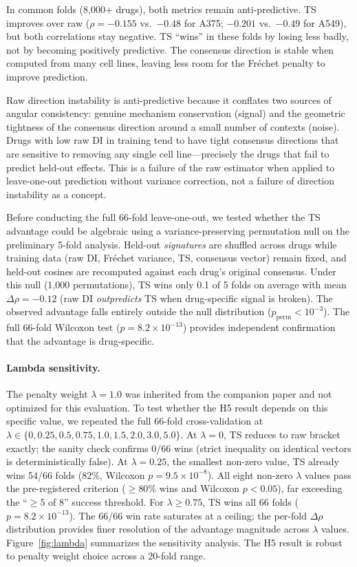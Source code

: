 \documentclass[11pt]{article}
\begin{document}
In common folds (8{,}000+ drugs), both metrics remain
anti-predictive. TS improves over raw ($\rho = -0.155$ vs.\ $-0.48$ for
A375; $-0.201$ vs.\ $-0.49$ for A549), but both correlations stay
negative. TS ``wins'' in these folds by losing less badly, not by becoming
positively predictive. The consensus direction is stable when computed from
many cell lines, leaving less room for the Fr\'{e}chet penalty to
improve prediction.

Raw direction instability is anti-predictive because it conflates two
sources of angular consistency: genuine mechanism conservation (signal)
and the geometric tightness of the consensus direction around a small
number of contexts (noise). Drugs with low raw DI in training tend to
have tight consensus directions that are sensitive to removing any single
cell line---precisely the drugs that fail to predict held-out effects.
This is a failure of the raw estimator when applied to leave-one-out
prediction without variance correction, not a failure of direction
instability as a concept.

Before conducting the full 66-fold leave-one-out, we tested whether the
TS advantage could be algebraic using a variance-preserving permutation
null on the preliminary 5-fold analysis. Held-out
\emph{signatures} are shuffled across drugs while training data
(raw DI, Fr\'echet variance, TS, consensus vector) remain fixed,
and held-out cosines are recomputed against each drug's original
consensus. Under this null (1{,}000 permutations),
TS wins only 0.1 of 5 folds on average with mean $\Delta\rho = -0.12$
(raw DI \emph{outpredicts} TS when drug-specific signal is broken).
The observed advantage falls entirely outside the null distribution
($p_{\text{perm}} < 10^{-3}$). The full 66-fold Wilcoxon test
($p = 8.2 \times 10^{-13}$) provides independent confirmation that the
advantage is drug-specific.

\paragraph{Lambda sensitivity.}
The penalty weight $\lambda = 1.0$ was inherited from the companion paper
and not optimized for this evaluation. To test whether the H5 result depends
on this specific value, we repeated the full 66-fold cross-validation at
$\lambda \in \{0, 0.25, 0.5, 0.75, 1.0, 1.5, 2.0, 3.0, 5.0\}$.
At $\lambda = 0$, TS reduces to raw bracket exactly; the sanity check
confirms 0/66 wins (strict inequality on identical vectors is
deterministically false). At $\lambda = 0.25$, the smallest non-zero value,
TS already wins 54/66 folds (82\%, Wilcoxon $p = 9.5 \times 10^{-8}$). All
eight non-zero $\lambda$ values pass the pre-registered criterion
($\geq 80\%$ wins and Wilcoxon $p < 0.05$), far exceeding the ``$\geq 5$
of 8'' success threshold. For $\lambda \geq 0.75$, TS wins all 66 folds
($p = 8.2 \times 10^{-13}$). The 66/66 win rate saturates at a ceiling; the per-fold $\Delta\rho$
distribution provides finer resolution of the advantage magnitude across
$\lambda$ values.
Figure~\ref{fig:lambda} summarizes the sensitivity analysis.
The H5 result is robust to penalty weight choice across a 20-fold range.
\end{document}
